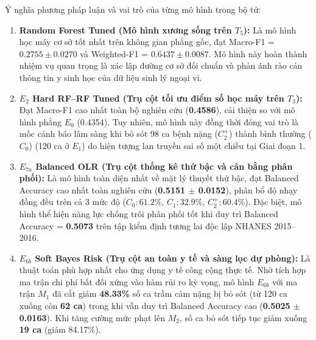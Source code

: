 Ý nghĩa phương pháp luận và vai trò của từng mô hình trong bộ tứ:
\begin{enumerate}
    \item \textbf{Random Forest Tuned (Mô hình xương sống trên $T_5$):} Là mô hình học máy cơ sở tốt nhất trên không gian phẳng gốc, đạt Macro-F1 = $0.2755 \pm 0.0270$ và Weighted-F1 = $0.6437 \pm 0.0087$. Mô hình này hoàn thành nhiệm vụ quan trọng là xác lập đường cơ sở đối chuẩn và phản ánh rào cản thông tin y sinh học của dữ liệu sinh lý ngoại vi.
    \item \textbf{$E_2$ Hard RF--RF Tuned (Trụ cột tối ưu điểm số học máy trên $T_3$):} Đạt Macro-F1 cao nhất toàn bộ nghiên cứu (\textbf{0.4586}), cải thiện so với mô hình phẳng $E_0$ (0.4354). Tuy nhiên, mô hình này đồng thời đóng vai trò là mốc cảnh báo lâm sàng khi bỏ sót 98 ca bệnh nặng ($C_2^+$) thành bình thường ($C_0$) (120 ca ở $E_1$) do hiện tượng lan truyền sai số một chiều tại Giai đoạn 1.
    \item \textbf{$E_{7a}$ Balanced OLR (Trụ cột thống kê thứ bậc và cân bằng phân phối):} Là mô hình toàn diện nhất về mặt lý thuyết thứ bậc, đạt Balanced Accuracy cao nhất toàn nghiên cứu (\textbf{0.5151 $\pm$ 0.0152}), phân bổ độ nhạy đồng đều trên cả 3 mức độ ($C_0: 61.2\%$, $C_1: 32.9\%$, $C_2^+: 60.4\%$). Đặc biệt, mô hình thể hiện năng lực chống trôi phân phối tốt khi duy trì Balanced Accuracy = \textbf{0.5073} trên tập kiểm định tương lai độc lập NHANES 2015--2016.
    \item \textbf{$E_{6b}$ Soft Bayes Risk (Trụ cột an toàn y tế và sàng lọc dự phòng):} Là thuật toán phù hợp nhất cho ứng dụng y tế công cộng thực tế. Nhờ tích hợp ma trận chi phí bất đối xứng vào hàm rủi ro kỳ vọng, mô hình $E_{6b}$ với ma trận $M_1$ đã cắt giảm \textbf{48.33\%} số ca trầm cảm nặng bị bỏ sót (từ 120 ca xuống còn \textbf{62 ca}) trong khi vẫn duy trì Balanced Accuracy cao (\textbf{0.5025 $\pm$ 0.0163}). Khi tăng cường mức phạt lên $M_2$, số ca bỏ sót tiếp tục giảm xuống \textbf{19 ca} (giảm 84.17\%).
\end{enumerate}

